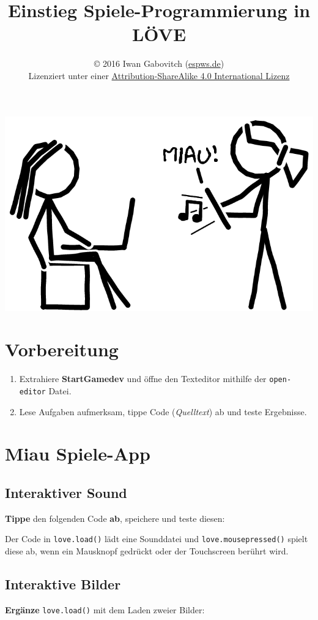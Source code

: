\documentclass[a4paper, 11pt]{article}
\date{\vspace{-5ex}}
\title{\vspace{-8ex}Einstieg Spiele-Programmierung in LÖVE\vspace{-1ex}}
\author{\copyright{} 2016 Iwan Gabovitch (\href{http://espws.de}{espws.de})\\
Lizenziert unter einer \href{http://creativecommons.org/licenses/by-sa/4.0/}{Attribution-ShareAlike 4.0 International Lizenz}}
\begin{document}
\maketitle
\thispagestyle{fancy}

\begin{center}
  \includegraphics[width=.4\textwidth]{graphics/fertig.png}
\end{center}

\section{Vorbereitung}

\begin{enumerate}
  \item Extrahiere \textbf{StartGamedev} und öffne den Texteditor mithilfe der \texttt{open-editor} Datei.
  \item Lese Aufgaben aufmerksam, tippe Code (\textit{Quelltext}) ab und teste Ergebnisse.
\end{enumerate}

\section{Miau Spiele-App}

\subsection{Interaktiver Sound}

\textbf{Tippe} den folgenden Code \textbf{ab}, speichere und teste diesen:



Der Code in \texttt{love.load()} lädt eine Sounddatei und \texttt{love.mousepressed()} spielt diese ab, wenn ein Mausknopf gedrückt oder der Touchscreen berührt wird.

\subsection{Interaktive Bilder}

\textbf{Ergänze} \texttt{love.load()} mit dem Laden zweier Bilder:
\end{document}
